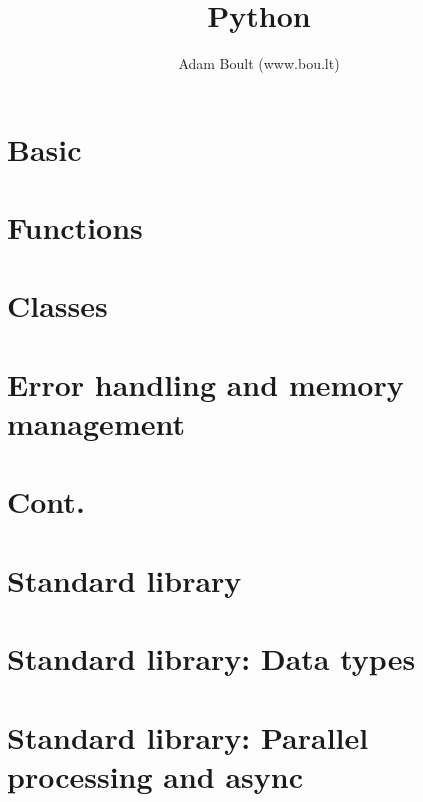 \documentclass[oneside]{book}
\begin{document}
\author{Adam Boult (www.bou.lt)}
\title{Python}
\maketitle

\setcounter{tocdepth}{0}
\tableofcontents



\part{Basic}





\part{Functions}


\part{Classes}


\part{Error handling and memory management}




\part{Cont.}


\part{Standard library}













\part{Standard library: Data types}


\part{Standard library: Parallel processing and async}


\end{document}
